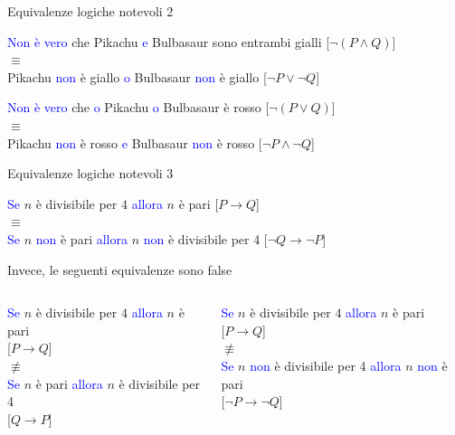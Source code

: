 \documentclass[aspectratio=169,10pt]{beamer}
\newcommand{\conn}[1]{\textcolor{blue}{#1}}
\begin{document}
\begin{frame}{Equivalenze logiche notevoli 2}
\begin{example}
\conn{Non è vero} che Pikachu \conn{e} Bulbasaur sono entrambi gialli [\alert{$\neg (P \wedge Q)$}] \\
\medskip
\hspace{1cm}$\equiv$\\
\medskip
Pikachu \conn{non} è giallo \conn{o} Bulbasaur \conn{non} è giallo [\alert{$\neg P \vee \neg Q$}]
\end{example}

\begin{example}
\conn{Non è vero} che \conn{o} Pikachu \conn{o} Bulbasaur è rosso [\alert{$\neg (P \vee Q)$}] \\
\medskip
\hspace{1cm}$\equiv$\\
\medskip
Pikachu \conn{non} è rosso \conn{e} Bulbasaur \conn{non} è rosso [\alert{$\neg P \wedge \neg Q$}]
\end{example}
\end{frame}

\begin{frame}{Equivalenze logiche notevoli 3}
\begin{example}
\conn{Se} $n$ è divisibile per $4$ \conn{allora} $n$ è pari [\alert{$P \to Q$}]\\
\medskip
\hspace{2cm}$\equiv$\\
\medskip
\conn{Se} $n$ \conn{non} è pari \conn{allora} $n$ \conn{non} è divisibile per 4 [\alert{$\neg Q \to \neg P$}]
\end{example}
Invece, le seguenti equivalenze sono false
\begin{columns}
\begin{example}
\conn{Se} $n$ è divisibile per $4$ \conn{allora} $n$ è pari\\[0cm] [\alert{$P \to Q$}]\\
\medskip
\hspace{2cm}\alert{$\not\equiv$}\\
\medskip
\conn{Se} $n$ è pari \conn{allora} $n$ è divisibile per 4\\[0cm] [\alert{$Q \to P$}]
\end{example}
\begin{example}
\conn{Se} $n$ è divisibile per $4$ \conn{allora} $n$ è pari\\[0cm] [\alert{$P \to Q$}]\\
\medskip
\hspace{2cm}\alert{$\not\equiv$}\\
\medskip
\conn{Se} $n$ \conn{non} è divisibile per 4 \conn{allora} $n$ \conn{non} è pari \\[0cm] [\alert{$\neg P \to \neg Q$}]
\end{example}
\end{columns}
\end{frame}
\end{document}
